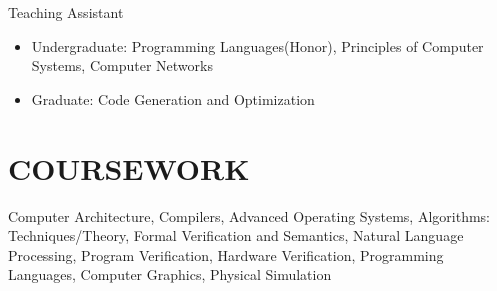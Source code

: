 \documentclass[margin, 9pt]{res} %
\begin{document}
\begin{resume}
{\large{Teaching Assistant}}\\
\vspace*{-5pt}
\begin{itemize}[leftmargin=*] \itemsep -2pt
\vspace*{-5pt}
	\item Undergraduate: Programming Languages(Honor), Principles of Computer Systems, Computer Networks
	\item Graduate: Code Generation and Optimization
\end{itemize}


\section{COURSEWORK} 

\vspace*{-2pt}
	Computer Architecture, Compilers, Advanced Operating Systems, Algorithms: Techniques/Theory, Formal Verification and Semantics, Natural Language Processing, Program Verification, Hardware Verification, Programming Languages, Computer Graphics, Physical Simulation


\end{resume}
\end{document}
